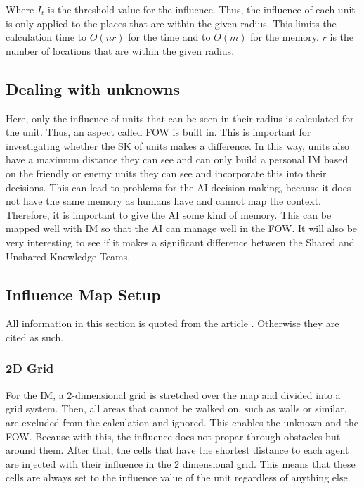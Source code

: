 \documentclass[]{report}
\begin{document}
	Where $I_t$ is the threshold value for the influence. Thus, the influence of each unit is only applied to the places that are within the given radius. This limits the calculation time to $O(nr)$ for the time and to $O(m)$ for the memory. $r$ is the number of locations that are within the given radius.
	
	\subsection{Dealing with unknowns} \label{ssec:dwu}
	Here, only the influence of units that can be seen in their radius is calculated for the unit. Thus, an aspect called \ac{FOW} is built in. This is important for investigating whether the \ac{SK} of units makes a difference. In this way, units also have a maximum distance they can see and can only build a personal \ac{IM} based on the friendly or enemy units they can see and incorporate this into their decisions. This can lead to problems for the \ac{AI} decision making, because it does not have the same memory as humans have and cannot map the context. Therefore, it is important to give the \ac{AI} some kind of memory. This can be mapped well with IM so that the \ac{AI} can manage well in the \ac{FOW}. It will also be very interesting to see if it makes a significant difference between the Shared and Unshared Knowledge Teams.
	
	\subsection{Influence Map Setup}
	All information in this section is quoted from the article \citep{gameDevInfluenceMap}. Otherwise they are cited as such. \newline
	
	\subsubsection{2D Grid}
	For the \ac{IM}, a 2-dimensional grid is stretched over the map and divided into a grid system. Then, all areas that cannot be walked on, such as walls or similar, are excluded from the calculation and ignored. This enables the unknown and the \ac{FOW}. Because with this, the influence does not propar through obstacles but around them. After that, the cells that have the shortest distance to each agent are injected with their influence in the 2 dimensional grid. This means that these cells are always set to the influence value of the unit regardless of anything else. 
	
\end{document}
